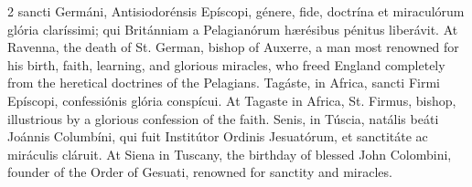 \begin{paracol}{2}
 sancti Germáni, Antisiodorénsis Epíscopi, génere, fide, doctrína et 
 miraculórum glória claríssimi; qui Británniam a Pelagianórum hærésibus 
 pénitus liberávit.
\switchcolumn
{}
At Ravenna, the death of St. 
 German, bishop of Auxerre, a man most renowned for his birth, faith, 
 learning, and glorious miracles, who freed England completely from the 
 heretical doctrines of the Pelagians.
\switchcolumn*
{}
Tagáste, in Africa, 
 sancti Firmi Epíscopi, confessiónis glória conspícui.
\switchcolumn
{}
At Tagaste in Africa, St. Firmus, 
 bishop, illustrious by a glorious confession of the faith.
\switchcolumn*
{}
Senis, in Túscia, 
 natális beáti Joánnis Columbíni, qui fuit Institútor Ordinis Jesuatórum, et 
 sanctitáte ac miráculis cláruit.
\switchcolumn
{}
At Siena in Tuscany, the birthday of 
 blessed John Colombini, founder of the Order of Gesuati, renowned for 
 sanctity and miracles.
\switchcolumn*
{}
\end{paracol}

